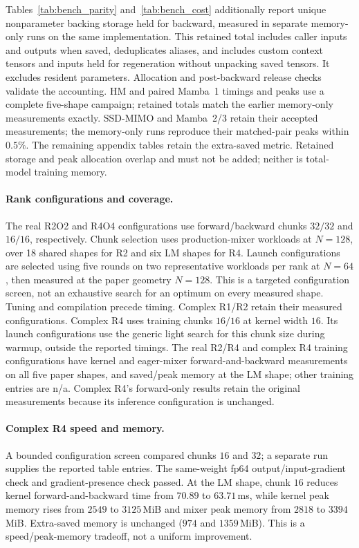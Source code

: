 Tables~\ref{tab:bench_parity} and~\ref{tab:bench_cost} additionally report
unique nonparameter backing storage held for backward, measured in separate
memory-only runs on the same implementation. This retained total includes
caller inputs and outputs when saved, deduplicates aliases, and includes
custom context tensors and inputs held for regeneration without unpacking
saved tensors. It excludes resident parameters. Allocation and post-backward
release checks validate the accounting. HM and paired Mamba~1 timings and
peaks use a complete five-shape campaign; retained totals match the earlier
memory-only measurements exactly. SSD-MIMO and Mamba~2/3 retain their accepted
measurements; the memory-only runs reproduce their matched-pair peaks within $0.5\%$.
The remaining appendix tables retain the extra-saved metric. Retained storage
and peak allocation overlap and must not be added; neither is total-model
training memory.

\paragraph{Rank configurations and coverage.}
The real R2O2 and R4O4 configurations use forward/backward chunks $32/32$
and $16/16$, respectively. Chunk selection uses production-mixer workloads
at $N=128$, over 18 shared shapes for R2 and six LM shapes for R4.
Launch configurations are selected using five rounds on two representative
workloads per rank at $N=64$, then measured at the paper geometry $N=128$.
This is a targeted configuration screen, not an exhaustive search for an
optimum on every measured shape. Tuning and compilation precede timing.
Complex R1/R2 retain their measured configurations. Complex R4 uses training
chunks $16/16$ at kernel width $16$. Its launch configurations use the generic
light search for this chunk size during warmup, outside the reported timings.
The real R2/R4 and complex R4 training configurations have kernel and eager-mixer
forward-and-backward measurements on all five paper shapes, and saved/peak
memory at the LM shape; other training entries are n/a. Complex R4's
forward-only results retain the original measurements because its inference
configuration is unchanged.

\paragraph{Complex R4 speed and memory.}
A bounded configuration screen compared chunks $16$ and $32$; a separate run
supplies the reported table entries. The same-weight fp64 output/input-gradient
check and gradient-presence check passed. At the LM shape, chunk $16$ reduces
kernel forward-and-backward time from $70.89$ to $63.71$\,ms, while kernel
peak memory rises from $2549$ to $3125$\,MiB and mixer peak memory from
$2818$ to $3394$\,MiB. Extra-saved memory is unchanged ($974$ and
$1359$\,MiB). This is a speed/peak-memory tradeoff, not a uniform improvement.

